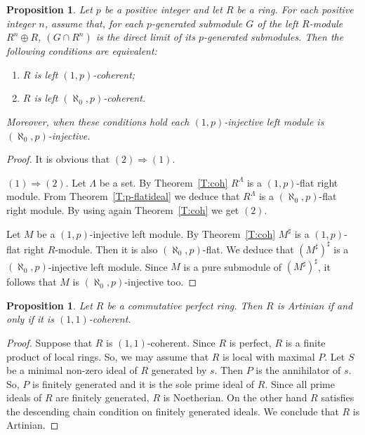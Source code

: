 \documentclass{amsart}
\newtheorem{proposition}[theorem]{Proposition}
\begin{document}
\begin{proposition}
\label{P:PF=PP} Let $p$ be a positive integer and let $R$ be a ring. For each positive integer $n$, assume that, for each $p$-generated submodule $G$ of the left $R$-module $R^n\oplus R$, $(G\cap R^n)$ is the direct limit of its $p$-generated submodules. Then the following conditions are equivalent:
\begin{enumerate}
\item $R$ is left $(1,p)$-coherent;
\item $R$ is left $(\aleph_0,p)$-coherent.
\end{enumerate}
Moreover, when these conditions hold each $(1,p)$-injective left module is $(\aleph_0,p)$-injective.
\end{proposition}
\begin{proof}
It is obvious that $(2)\Rightarrow (1)$. 

$(1)\Rightarrow (2)$. Let $\Lambda$ be a set. By Theorem~\ref{T:coh} $R^{\Lambda}$ is a $(1,p)$-flat right module. From Theorem~\ref{T:p-flatideal} we deduce that $R^{\Lambda}$ is a $(\aleph_0,p)$-flat right module. By using again Theorem~\ref{T:coh} we get $(2)$. 

Let $M$ be a $(1,p)$-injective left module. By Theorem~\ref{T:coh} $M^{\sharp}$ is a $(1,p)$-flat right $R$-module. Then it is also $(\aleph_0,p)$-flat. We deduce that $(M^{\sharp})^{\sharp}$ is a $(\aleph_0,p)$-injective left module. Since $M$ is a pure submodule of $(M^{\sharp})^{\sharp}$, it follows that $M$ is $(\aleph_0,p)$-injective too.
\end{proof}
\begin{proposition}
\label{P:CommParf} Let $R$ be a commutative perfect ring. Then $R$ is Artinian if and only if it is $(1,1)$-coherent.
\end{proposition}
\begin{proof}
Suppose that $R$ is $(1,1)$-coherent. Since $R$ is perfect, $R$ is a finite product of local rings. So, we may assume that $R$ is local with maximal $P$. Let $S$ be a minimal non-zero ideal of $R$ generated by $s$. Then $P$ is the annihilator of $s$. So, $P$ is finitely generated and it is the sole prime ideal of $R$. Since all prime ideals of $R$ are finitely generated, $R$ is Noetherian. On the other hand $R$ satisfies the descending chain condition on finitely generated ideals. We conclude that $R$ is Artinian.
\end{proof}
\end{document}

